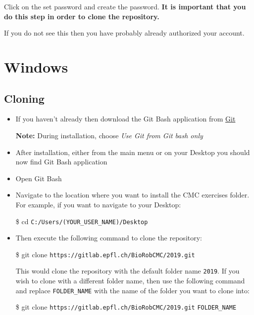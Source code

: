 \documentclass{cmc}
\begin{document}
Click on the set password and create the password. \textbf{It is
  important that you do this step in order to clone the repository.}

If you do not see this then you have probably already authorized your
account.

\section{Windows}
\label{sec:windows}

\subsection{Cloning}
\label{sec:windows_cloning}
\begin{itemize}
\item If you haven't already then download the Git Bash application
  from \href{https://git-scm.com/download/win}{Git}

  \textbf{Note:} During installation, choose \textit{Use Git from Git
    bash only}

\item After installation, either from the main menu or on your Desktop
  you should now find Git Bash application
\item Open Git Bash
\item Navigate to the location where you want to install the CMC
  exercises folder. For example, if you want to navigate to your
  Desktop:

  \begin{center}
    \$ cd \verb|C:/Users/(YOUR_USER_NAME)/Desktop|
  \end{center}

\item Then execute the following command to clone the repository:
  \begin{center}
    \$ git clone \verb|https://gitlab.epfl.ch/BioRobCMC/2019.git|
  \end{center}

  This would clone the repository with the default folder name
  \verb|2019|. If you wish to clone with a different folder name, then
  use the following command and replace \verb|FOLDER_NAME| with the
  name of the folder you want to clone into:
  \begin{center}
    \$ git clone \verb|https://gitlab.epfl.ch/BioRobCMC/2019.git|
    \verb|FOLDER_NAME|
  \end{center}

\end{itemize}
\end{document}
